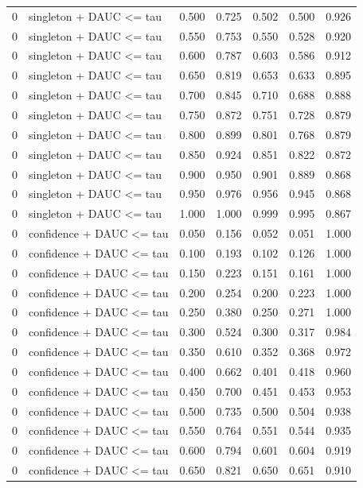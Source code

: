 \begin{tabular}{rlrrrrr}
0 & singleton + DAUC <= tau & 0.500 & 0.725 & 0.502 & 0.500 & 0.926 \\
0 & singleton + DAUC <= tau & 0.550 & 0.753 & 0.550 & 0.528 & 0.920 \\
0 & singleton + DAUC <= tau & 0.600 & 0.787 & 0.603 & 0.586 & 0.912 \\
0 & singleton + DAUC <= tau & 0.650 & 0.819 & 0.653 & 0.633 & 0.895 \\
0 & singleton + DAUC <= tau & 0.700 & 0.845 & 0.710 & 0.688 & 0.888 \\
0 & singleton + DAUC <= tau & 0.750 & 0.872 & 0.751 & 0.728 & 0.879 \\
0 & singleton + DAUC <= tau & 0.800 & 0.899 & 0.801 & 0.768 & 0.879 \\
0 & singleton + DAUC <= tau & 0.850 & 0.924 & 0.851 & 0.822 & 0.872 \\
0 & singleton + DAUC <= tau & 0.900 & 0.950 & 0.901 & 0.889 & 0.868 \\
0 & singleton + DAUC <= tau & 0.950 & 0.976 & 0.956 & 0.945 & 0.868 \\
0 & singleton + DAUC <= tau & 1.000 & 1.000 & 0.999 & 0.995 & 0.867 \\
0 & confidence + DAUC <= tau & 0.050 & 0.156 & 0.052 & 0.051 & 1.000 \\
0 & confidence + DAUC <= tau & 0.100 & 0.193 & 0.102 & 0.126 & 1.000 \\
0 & confidence + DAUC <= tau & 0.150 & 0.223 & 0.151 & 0.161 & 1.000 \\
0 & confidence + DAUC <= tau & 0.200 & 0.254 & 0.200 & 0.223 & 1.000 \\
0 & confidence + DAUC <= tau & 0.250 & 0.380 & 0.250 & 0.271 & 1.000 \\
0 & confidence + DAUC <= tau & 0.300 & 0.524 & 0.300 & 0.317 & 0.984 \\
0 & confidence + DAUC <= tau & 0.350 & 0.610 & 0.352 & 0.368 & 0.972 \\
0 & confidence + DAUC <= tau & 0.400 & 0.662 & 0.401 & 0.418 & 0.960 \\
0 & confidence + DAUC <= tau & 0.450 & 0.700 & 0.451 & 0.453 & 0.953 \\
0 & confidence + DAUC <= tau & 0.500 & 0.735 & 0.500 & 0.504 & 0.938 \\
0 & confidence + DAUC <= tau & 0.550 & 0.764 & 0.551 & 0.544 & 0.935 \\
0 & confidence + DAUC <= tau & 0.600 & 0.794 & 0.601 & 0.604 & 0.919 \\
0 & confidence + DAUC <= tau & 0.650 & 0.821 & 0.650 & 0.651 & 0.910 \\

\end{tabular}
